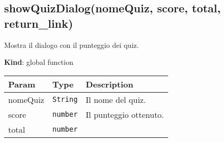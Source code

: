 \protect\hypertarget{showQuizDialog}{}{}

\hypertarget{showquizdialognomequiz-score-total-return_link}{%
\subsection{showQuizDialog(nomeQuiz, score, total,
return\_link)}\label{showquizdialognomequiz-score-total-return_link}}

Mostra il dialogo con il punteggio dei quiz.

\textbf{Kind}: global function

\begin{tabularx}{\textwidth}{XXX}
\toprule
\begin{minipage}[b]{0.30\columnwidth}\raggedright
Param\strut
\end{minipage} & \begin{minipage}[b]{0.30\columnwidth}\raggedright
Type\strut
\end{minipage} & \begin{minipage}[b]{0.30\columnwidth}\raggedright
Description\strut
\end{minipage}\tabularnewline
\midrule
\endhead
\begin{minipage}[t]{0.30\columnwidth}\raggedright
nomeQuiz\strut
\end{minipage} & \begin{minipage}[t]{0.30\columnwidth}\raggedright
\texttt{String}\strut
\end{minipage} & \begin{minipage}[t]{0.30\columnwidth}\raggedright
Il nome del quiz.\strut
\end{minipage}\tabularnewline
\begin{minipage}[t]{0.30\columnwidth}\raggedright
score\strut
\end{minipage} & \begin{minipage}[t]{0.30\columnwidth}\raggedright
\texttt{number}\strut
\end{minipage} & \begin{minipage}[t]{0.30\columnwidth}\raggedright
Il punteggio ottenuto.\strut
\end{minipage}\tabularnewline
\begin{minipage}[t]{0.30\columnwidth}\raggedright
total\strut
\end{minipage} & \begin{minipage}[t]{0.30\columnwidth}\raggedright
\texttt{number}\strut
\end{minipage} & \begin{minipage}[t]{0.30\columnwidth}\raggedright

\end{minipage}
\end{tabularx}

